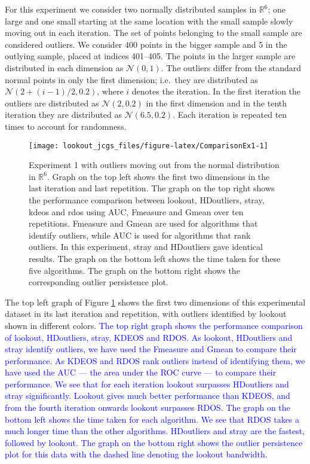 \documentclass[12pt]{article}
\theoremstyle{definition}
\theoremstyle{definition}
\theoremstyle{definition}
\theoremstyle{definition}
\theoremstyle{remark}
\begin{document}
For this experiment we consider two normally distributed samples in \(\mathbb{R}^6\); one large and one small starting at the same location with the small sample slowly moving out in each iteration. The set of points belonging to the small sample are considered outliers. We consider 400 points in the bigger sample and 5 in the outlying sample, placed at indices 401--405. The points in the larger sample are distributed in each dimension as \(\mathcal{N}(0, 1)\). The outliers differ from the standard normal points in only the first dimension; i.e.~they are distributed as \(\mathcal{N}\left(2 + (i-1)/2, 0.2 \right)\), where \(i\) denotes the iteration. In the first iteration the outliers are distributed as \(\mathcal{N}\left(2, 0.2 \right)\) in the first dimension and in the tenth iteration they are distributed as \(\mathcal{N}\left(6.5, 0.2 \right)\). Each iteration is repeated ten times to account for randomness.

\begin{figure}
\texttt{[image: lookout\_jcgs\_files/figure-latex/ComparisonEx1-1]} \caption{Experiment 1 with outliers moving out from the normal distribution in $\mathbb{R}^6$. Graph on the top left shows the first two dimensions in the last iteration and last repetition. The graph on the top right shows the performance comparison between lookout, HDoutliers, stray, kdeos and rdos using AUC, Fmeasure and Gmean over ten repetitions. Fmeasure and Gmean are used for algorithms that identify outliers, while AUC is used for algorithms that rank outliers. In this experiment, stray and HDoutliers gave identical results. The graph on the bottom left shows the time taken for these five algorithms. The graph on the bottom right shows the corresponding outlier persistence plot.}\label{fig:ComparisonEx1}
\end{figure}

The top left graph of Figure \ref{fig:ComparisonEx1} shows the first two dimensions of this experimental dataset in its last iteration and repetition, with outliers identified by lookout shown in different colors.
\textcolor{blue}{The top right graph shows the performance comparison of lookout, HDoutliers, stray, KDEOS and RDOS. As lookout, HDoutliers and stray identify outliers, we have used the Fmeasure and Gmean to compare their performance. As KDEOS and RDOS rank outliers instead of identifying them, we have used the AUC --- the area under the ROC curve --- to compare their performance. We see that for each iteration lookout surpasses HDoutliers and stray significantly. Lookout gives much better performance than KDEOS, and from the fourth iteration onwards lookout surpasses RDOS. The graph on the bottom left shows the time taken for each algorithm. We see that RDOS takes a much longer time than the other algorithms. HDoutliers and stray are the fastest, followed by lookout. The graph on the bottom right shows the outlier persistence plot for this data with the dashed line denoting the lookout bandwidth.}
\end{document}
